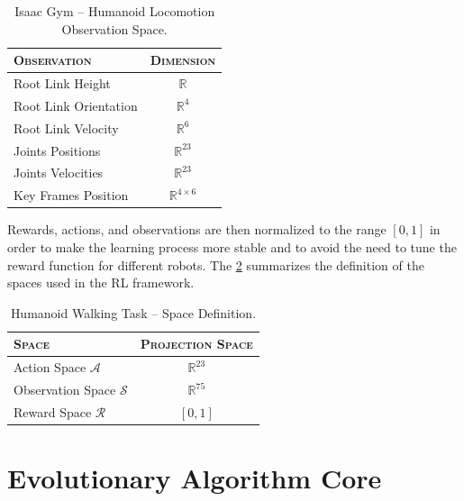 \begin{table}
    \centering
    \label{tab:walkingobs_isaacgym}
    \begin{tabular}{l c}
        \toprule
        \textsc{Observation}  & \textsc{Dimension}         \\
        \midrule
        Root Link Height      & $\mathbb{R}$               \\
        Root Link Orientation & $\mathbb{R} ^{4}$          \\
        Root Link Velocity    & $\mathbb{R} ^{6}$          \\
        Joints Positions      & $\mathbb{R} ^{23}$         \\
        Joints Velocities     & $\mathbb{R} ^{23}$         \\
        Key Frames Position   & $\mathbb{R} ^{4 \times 6}$ \\
        \bottomrule
    \end{tabular}
    \caption{Isaac Gym -- Humanoid Locomotion Observation Space.}
\end{table}

Rewards, actions, and observations are then normalized to the range $[0,1]$ in order to make the learning process more stable and to avoid the need to tune the reward function for different robots. The \cref{tab:cartpoletaskspacedef} summarizes the definition of the spaces used in the \ac{RL} framework.

\begin{table}
    \centering
    \caption{Humanoid Walking Task -- Space Definition.}
    \label{tab:cartpoletaskspacedef}
    \begin{tabular}{l c}
        \toprule
        \textsc{Space}                  & \textsc{Projection Space} \\
        \midrule
        Action Space $\mathcal{A}$      & $\mathbb{R} ^{23}$        \\
        Observation Space $\mathcal{S}$ & $\mathbb{R} ^{75}$        \\
        Reward Space $\mathcal{R}$      & $[0,1]$                   \\
        \bottomrule
    \end{tabular}
\end{table}


\section{Evolutionary Algorithm Core}
\label{sec:EvolutionAlgo}

